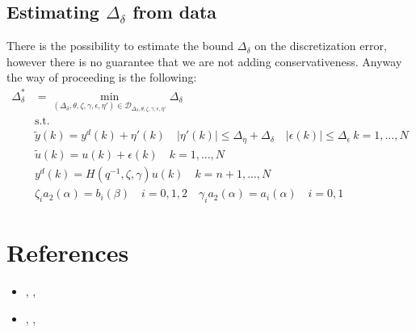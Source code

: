 \subsection{Estimating $\Delta_\delta$ from data}
There is the possibility to estimate the bound $\Delta_\delta$ on the discretization error, however there is no guarantee that we are not adding conservativeness. Anyway the way of proceeding is the following:
\begin{equation}
    \begin{aligned}
        \Delta_\delta^*&=\min_{(\Delta_\delta,\theta,\zeta,\gamma,\epsilon,\eta')\in\mathcal{D}_{\Delta_\delta,\theta,\zeta,\gamma,\epsilon,\eta'}} \Delta_\delta\\
        &\text{s.t.} \\
        &\tilde{y}(k)=y^d(k)+\eta'(k) \quad 
          \vert \eta'(k) \vert \le \Delta_\eta+\Delta_\delta \quad
        \vert \epsilon(k) \vert \le \Delta_\epsilon \ k=1,...,N\\
    &\tilde{u}(k)=u(k)+\epsilon(k) \quad k=1,...,N\\
    &y^d(k)=H(q^{-1},\zeta,\gamma)u(k) \quad 
    k=n+1,...,N\\
    &
    \zeta_i a_2(\alpha)=b_i(\beta) \quad i=0,1,2   \quad \gamma_i a_2(\alpha)=a_i(\alpha) \quad i=0,1
    \end{aligned}
\end{equation}

\section*{References}
\begin{itemize}
    \itemsep-0.3em
    \item[\Large{\ding{45}}]  , \textit{}, 
    \item[\Large{\ding{45}}]  , \textit{}, 
\end{itemize}
